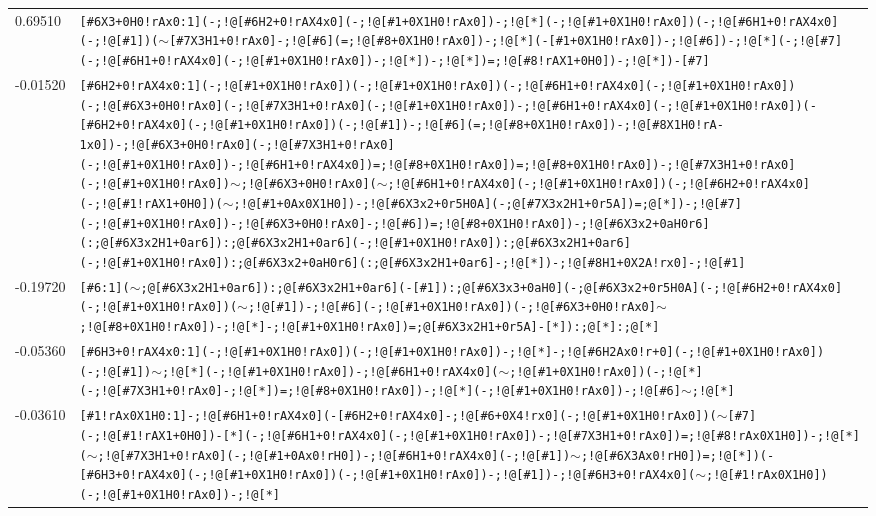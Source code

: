 \begin{longtable}{>{\baselineskip=10pt}p{} >{\baselineskip=10pt}p{}}
0.69510 & \texttt{[\#6X3+0H0!rAx0:1](-;!@[\#6H2+0!rAX4x0](-;!@[\#1+0X1H0!rAx0])-;!@[*](-;!@[\#1+0X1H0!rAx0])(-;!@[\#6H1+0!rAX4x0](-;!@[\#1])($\sim$[\#7X3H1+0!rAx0]-;!@[\#6](=;!@[\#8+0X1H0!rAx0])-;!@[*](-[\#1+0X1H0!rAx0])-;!@[\#6])-;!@[*](-;!@[\#7](-;!@[\#6H1+0!rAX4x0](-;!@[\#1+0X1H0!rAx0])-;!@[*])-;!@[*])=;!@[\#8!rAX1+0H0])-;!@[*])-[\#7]} \\ 
-0.01520 & \texttt{[\#6H2+0!rAX4x0:1](-;!@[\#1+0X1H0!rAx0])(-;!@[\#1+0X1H0!rAx0])(-;!@[\#6H1+0!rAX4x0](-;!@[\#1+0X1H0!rAx0])(-;!@[\#6X3+0H0!rAx0](-;!@[\#7X3H1+0!rAx0](-;!@[\#1+0X1H0!rAx0])-;!@[\#6H1+0!rAX4x0](-;!@[\#1+0X1H0!rAx0])(-[\#6H2+0!rAX4x0](-;!@[\#1+0X1H0!rAx0])(-;!@[\#1])-;!@[\#6](=;!@[\#8+0X1H0!rAx0])-;!@[\#8X1H0!rA-1x0])-;!@[\#6X3+0H0!rAx0](-;!@[\#7X3H1+0!rAx0](-;!@[\#1+0X1H0!rAx0])-;!@[\#6H1+0!rAX4x0])=;!@[\#8+0X1H0!rAx0])=;!@[\#8+0X1H0!rAx0])-;!@[\#7X3H1+0!rAx0](-;!@[\#1+0X1H0!rAx0])$\sim$;!@[\#6X3+0H0!rAx0]($\sim$;!@[\#6H1+0!rAX4x0](-;!@[\#1+0X1H0!rAx0])(-;!@[\#6H2+0!rAX4x0](-;!@[\#1!rAX1+0H0])($\sim$;!@[\#1+0Ax0X1H0])-;!@[\#6X3x2+0r5H0A](-;@[\#7X3x2H1+0r5A])=;@[*])-;!@[\#7](-;!@[\#1+0X1H0!rAx0])-;!@[\#6X3+0H0!rAx0]-;!@[\#6])=;!@[\#8+0X1H0!rAx0])-;!@[\#6X3x2+0aH0r6](:;@[\#6X3x2H1+0ar6]):;@[\#6X3x2H1+0ar6](-;!@[\#1+0X1H0!rAx0]):;@[\#6X3x2H1+0ar6](-;!@[\#1+0X1H0!rAx0]):;@[\#6X3x2+0aH0r6](:;@[\#6X3x2H1+0ar6]-;!@[*])-;!@[\#8H1+0X2A!rx0]-;!@[\#1]} \\ 
-0.19720 & \texttt{[\#6:1]($\sim$;@[\#6X3x2H1+0ar6]):;@[\#6X3x2H1+0ar6](-[\#1]):;@[\#6X3x3+0aH0](-;@[\#6X3x2+0r5H0A](-;!@[\#6H2+0!rAX4x0](-;!@[\#1+0X1H0!rAx0])($\sim$;!@[\#1])-;!@[\#6](-;!@[\#1+0X1H0!rAx0])(-;!@[\#6X3+0H0!rAx0]$\sim$;!@[\#8+0X1H0!rAx0])-;!@[*]-;!@[\#1+0X1H0!rAx0])=;@[\#6X3x2H1+0r5A]-[*]):;@[*]:;@[*]} \\ 
-0.05360 & \texttt{[\#6H3+0!rAX4x0:1](-;!@[\#1+0X1H0!rAx0])(-;!@[\#1+0X1H0!rAx0])-;!@[*]-;!@[\#6H2Ax0!r+0](-;!@[\#1+0X1H0!rAx0])(-;!@[\#1])$\sim$;!@[*](-;!@[\#1+0X1H0!rAx0])-;!@[\#6H1+0!rAX4x0]($\sim$;!@[\#1+0X1H0!rAx0])(-;!@[*](-;!@[\#7X3H1+0!rAx0]-;!@[*])=;!@[\#8+0X1H0!rAx0])-;!@[*](-;!@[\#1+0X1H0!rAx0])-;!@[\#6]$\sim$;!@[*]} \\ 
-0.03610 & \texttt{[\#1!rAx0X1H0:1]-;!@[\#6H1+0!rAX4x0](-[\#6H2+0!rAX4x0]-;!@[\#6+0X4!rx0](-;!@[\#1+0X1H0!rAx0])($\sim$[\#7](-;!@[\#1!rAX1+0H0])-[*](-;!@[\#6H1+0!rAX4x0](-;!@[\#1+0X1H0!rAx0])-;!@[\#7X3H1+0!rAx0])=;!@[\#8!rAx0X1H0])-;!@[*]($\sim$;!@[\#7X3H1+0!rAx0](-;!@[\#1+0Ax0!rH0])-;!@[\#6H1+0!rAX4x0](-;!@[\#1])$\sim$;!@[\#6X3Ax0!rH0])=;!@[*])(-[\#6H3+0!rAX4x0](-;!@[\#1+0X1H0!rAx0])(-;!@[\#1+0X1H0!rAx0])-;!@[\#1])-;!@[\#6H3+0!rAX4x0]($\sim$;!@[\#1!rAx0X1H0])(-;!@[\#1+0X1H0!rAx0])-;!@[*]} \\ 

\end{longtable}
